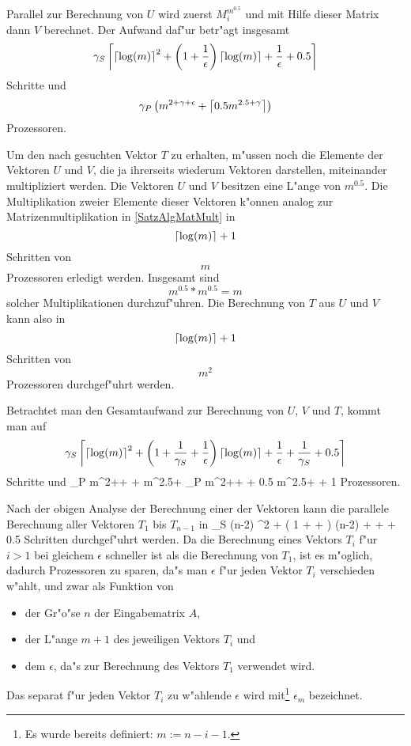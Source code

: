 Parallel zur Berechnung von $U$ wird zuerst
$M_i^{m^{0.5}}$ und mit Hilfe dieser Matrix dann $V$ berechnet. Der Aufwand
daf"ur betr"agt insgesamt
\[   \gamma_S
     \left\lceil
         \left\lceil \log(m) \right\rceil^2 + 
         \left( 1 + \frac{1}{\epsilon} \right) \left\lceil \log(m) \right\rceil + 
         \frac{1}{\epsilon} + 0.5
     \right\rceil
\] 
Schritte und
\[ 
   \gamma_P \left( m^{2+\gamma+\epsilon} + \left\lceil 0.5 m^{2.5+\gamma} \right\rceil \right)
\] Prozessoren.

Um den nach  gesuchten Vektor $T$ zu erhalten, 
m"ussen 
noch die Elemente der Vektoren $U$ und $V$, die ja ihrerseits wiederum 
Vektoren darstellen, miteinander multipliziert werden.
Die Vektoren $U$ und $V$ besitzen eine L"ange von $m^{0.5}$.
Die Multiplikation zweier Elemente dieser Vektoren k"onnen
analog zur Matrizenmultiplikation in \ref{SatzAlgMatMult} in 
\[ \left\lceil \log(m) \right\rceil + 1 \] Schritten von \[ m \] Prozessoren erledigt 
werden. Insgesamt sind \[ m^{0.5} * m^{0.5} = m \] solcher Multiplikationen
durchzuf"uhren. Die Berechnung von $T$ aus $U$ und $V$ kann
also in 
\[ \left\lceil \log(m) \right\rceil + 1 \] Schritten von \[ m^2 \] Prozessoren 
durchgef"uhrt werden.

Betrachtet man den Gesamtaufwand zur Berechnung von $U$, $V$ und $T$,
kommt man auf
\[ \gamma_S
   \left\lceil
       \left\lceil \log(m) \right\rceil^2
       + \left( 1 + \frac{1}{\gamma_S} 
       + \frac{1}{\epsilon} \right) \left\lceil \log(m) \right\rceil
       + \frac{1}{\epsilon} + \frac{1}{\gamma_S} + 0.5
   \right\rceil
\] 
Schritte und  
   \gamma_P \lb m^{2+\gamma+\epsilon} +  m^{2.5+\gamma} \rc \rb
      \leq
   \gamma_P \lb m^{2+\gamma+\epsilon} + 0.5 m^{2.5+\gamma} + 1 \rb
\Eeq
Prozessoren. 

Nach der
obigen Analyse der Berechnung einer der Vektoren kann die parallele
Berechnung aller Vektoren $T_1$ bis $T_{n-1}$ in
   \gamma_S
   \lc
       \lc \log(n-2) \rc^2 
       + \left( 1 + 
       +  \right) \lc \log(n-2) \rc + 
        +  + 0.5
   \rc
\Eeq
Schritten durchgef"uhrt werden. Da die Berechnung eines Vektors $T_i$ f"ur 
$i>1$ bei gleichem $\epsilon$ schneller ist als die Berechnung von 
$T_1$, ist es m"oglich, dadurch Prozessoren zu sparen, da"s man 
$\epsilon$ f"ur jeden Vektor $T_i$ verschieden w"ahlt, und zwar als Funktion
von 
\begin{itemize}
\item
      der Gr"o"se $n$ der Eingabematrix $A$,
\item 
      der L"ange $m+1$ des jeweiligen Vektors $T_i$ und
\item
      dem $\epsilon$, da"s zur Berechnung des Vektors $T_1$
      verwendet wird.
\end{itemize}
Das separat f"ur jeden Vektor $T_i$ zu w"ahlende $\epsilon$ wird 
mit\footnote{ Es wurde bereits definiert: $m:= n-i-1$.}
$\epsilon_m$ bezeichnet.

